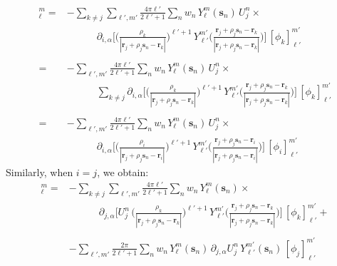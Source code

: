 \documentclass[12pt,letterpaper,oneside]{article}
\theoremstyle{definition}
\begin{document}
\begin{align*}
[(\partial_{i,\alpha} A) \phi\,_j]_\ell^m = & -\sum_{k\ne j}\sum_{\ell',m'}  \frac{4 \pi \ell'}{2 \ell'+1} \sum_n w_n \, Y_\ell^m(\boldsymbol{s}_n) \, U_j^n \times \\
& \qquad \quad \partial_{i,\alpha} \bigg[ \bigg( \frac{\rho_k}{| \boldsymbol{r}_j + \rho_j \boldsymbol{s}_n - \boldsymbol{r}_k |} \bigg)^{\ell'+1} \, Y_{\ell'}^{m'} \bigg( \frac{\boldsymbol{r}_j + \rho_j \boldsymbol{s}_n - \boldsymbol{r}_k}{| \boldsymbol{r}_j + \rho_j \boldsymbol{s}_n - \boldsymbol{r}_k |} \bigg) \bigg] \, [\phi_k]_{\ell '}^{m '} \\ \\
= & -\sum_{\ell',m'}  \frac{4 \pi \ell'}{2 \ell'+1} \sum_n w_n \, Y_\ell^m(\boldsymbol{s}_n) \, U_j^n \times \\
& \qquad \quad \sum_{k\ne j} \partial_{i,\alpha} \bigg[ \bigg( \frac{\rho_k}{| \boldsymbol{r}_j + \rho_j \boldsymbol{s}_n - \boldsymbol{r}_k |} \bigg)^{\ell'+1} \, Y_{\ell'}^{m'} \bigg( \frac{\boldsymbol{r}_j + \rho_j \boldsymbol{s}_n - \boldsymbol{r}_k}{| \boldsymbol{r}_j + \rho_j \boldsymbol{s}_n - \boldsymbol{r}_k |} \bigg) \bigg] \, [\phi_k]_{\ell '}^{m '} \\ \\
= & -\sum_{\ell',m'}  \frac{4 \pi \ell'}{2 \ell'+1} \sum_n w_n \, Y_\ell^m(\boldsymbol{s}_n) \, U_j^n \times \\
& \qquad \quad \partial_{i,\alpha} \bigg[ \bigg( \frac{\rho_i}{| \boldsymbol{r}_j + \rho_j \boldsymbol{s}_n - \boldsymbol{r}_i |} \bigg)^{\ell'+1} \, Y_{\ell'}^{m'} \bigg( \frac{\boldsymbol{r}_j + \rho_j \boldsymbol{s}_n - \boldsymbol{r}_i}{| \boldsymbol{r}_j + \rho_j \boldsymbol{s}_n - \boldsymbol{r}_i |} \bigg) \bigg] \, [\phi_i]_{\ell '}^{m '}
\end{align*}
Similarly, when $i = j$, we obtain:
\begin{align*}
[(\partial_{j,\alpha} A) \phi \,_j]_\ell^m  = & - \sum_{k\ne j} \sum_{\ell',m'}\frac{4 \pi \ell'}{2 \ell'+1} \sum_n w_n \, Y_\ell^m(\boldsymbol{s}_n) \times \\
& \qquad \quad \partial_{j,\alpha} \bigg[ U_j^n  \, \bigg( \frac{\rho_k}{|\boldsymbol{r}_j + \rho_j \boldsymbol{s}_n - \boldsymbol{r}_k|} \bigg)^{\ell'+1} \, Y_{\ell'}^{m'} \bigg( \frac{\boldsymbol{r}_j + \rho_j \boldsymbol{s}_n - \boldsymbol{r}_k}{|\boldsymbol{r}_j + \rho_j \boldsymbol{s}_n - \boldsymbol{r}_k |} \bigg) \bigg] \,  [\phi_k]_{\ell'}^{m'} +  \\  \\
& - \sum_{\ell',m'} \frac{2\pi}{2 \ell'+1}  \sum_n w_n \, Y_\ell^m(\boldsymbol{s}_n) \, \partial_{j,\alpha} U_j^n \, Y_{\ell'}^{m'}(\boldsymbol{s}_n) \, [\phi_j]_{\ell '}^{m '} 
\end{align*}
\end{document}
